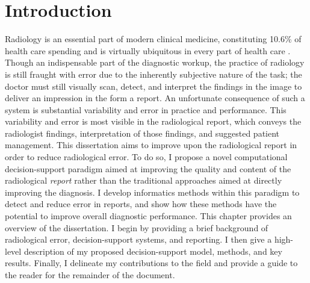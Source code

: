\chapter{Introduction}
Radiology is an essential part of modern clinical medicine, constituting 10.6\% of health care spending and is virtually ubiquitous in every part of health care \cite{Dodoo:tg}.
Though an indispensable part of the diagnostic workup, the practice of radiology is still fraught with error due to the inherently subjective nature of the task; the doctor must still visually scan, detect, and interpret the findings in the image to deliver an impression in the form a report. 
An unfortunate consequence of such a system is substantial variability and error in practice and performance.
This variability and error is most visible in the radiological report, which conveys the radiologist findings, interpretation of those findings, and suggested patient management. 
This dissertation aims to improve upon the radiological report in order to reduce radiological error.
To do so, I propose a novel computational decision-support paradigm aimed at improving the quality and content of the radiological \emph{report} rather than the traditional approaches aimed at directly improving the diagnosis.
I develop informatics methods within this paradigm to detect and reduce error in reports, and show how these methods have the potential to improve overall diagnostic performance. 
This chapter provides an overview of the dissertation. 
I begin by providing a brief background of radiological error, decision-support systems, and reporting. 
I then give a high-level description of my proposed decision-support model, methods, and key results. 
Finally, I delineate my contributions to the field and provide a guide to the reader for the remainder of the document.

